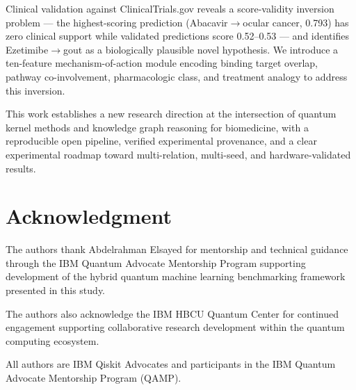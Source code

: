 \documentclass[10pt,twocolumn]{article}
\begin{document}
Clinical validation against ClinicalTrials.gov reveals a score-validity inversion problem --- the highest-scoring prediction (Abacavir$\to$ocular cancer, 0.793) has zero clinical support while validated predictions score 0.52--0.53 --- and identifies Ezetimibe$\to$gout as a biologically plausible novel hypothesis. We introduce a ten-feature mechanism-of-action module encoding binding target overlap, pathway co-involvement, pharmacologic class, and treatment analogy to address this inversion.

This work establishes a new research direction at the intersection of quantum kernel methods and knowledge graph reasoning for biomedicine, with a reproducible open pipeline, verified experimental provenance, and a clear experimental roadmap toward multi-relation, multi-seed, and hardware-validated results.

\section*{Acknowledgment}

The authors thank Abdelrahman Elsayed for mentorship and technical guidance through the IBM Quantum Advocate Mentorship Program supporting development of the hybrid quantum machine learning benchmarking framework presented in this study.

The authors also acknowledge the IBM HBCU Quantum Center for continued engagement supporting collaborative research development within the quantum computing ecosystem.

All authors are IBM Qiskit Advocates and participants in the IBM Quantum Advocate Mentorship Program (QAMP).

\end{document}
